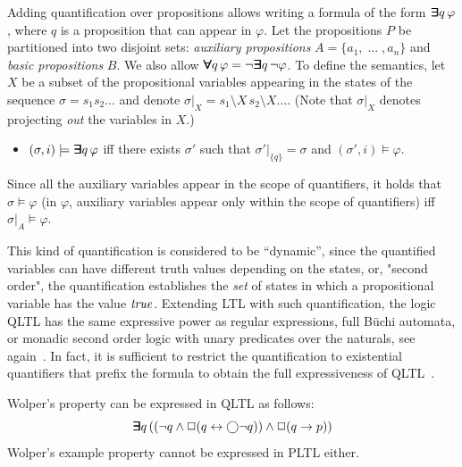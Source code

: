Adding quantification over propositions allows writing a formula of the form
$\bm{\exists}\kern-0.6em\bm{\exists} q \, \varphi$, where $q$ is a proposition that can appear in $\varphi$.
Let the propositions $P$ be partitioned into two disjoint sets: 
{\em auxiliary propositions} $A = \{ a_1 , \; \ldots\; , a_n \}$
and {\em basic propositions} $B$. 
We also allow $\bm{\forall}\kern-0.6em\bm{\forall} q\, \varphi =
\neg \bm{\exists}\kern-0.6em\bm{\exists} q\, \neg \varphi$.
To define the semantics, let $X$ be a subset of 
the propositional variables appearing in the states of the sequence $\sigma = s_1 s_2 \ldots$ and 
denote $\sigma |_X = s_1 \setminus X \, s_2 \setminus X \ldots$. (Note that $\sigma |_X$ denotes projecting {\em out} the variables in $X$.)



\begin{itemize}
\item $( \sigma, i ) \models \boldsymbol{\bm{\exists}\kern-0.6em\bm{\exists}} q \, \varphi$ iff there exists
$\sigma'$ such that $\sigma' |_{\{ q \} } = \sigma$ and 
$( \sigma', i) \models \varphi$.
\end{itemize}
Since all the auxiliary variables appear in the scope of
quantifiers, it holds that $\sigma \models \varphi$
(in $\varphi$, auxiliary variables appear only within
the scope of quantifiers)
iff $\sigma |_A \models \varphi$.

This kind of quantification is considered to be ``dynamic'', since the quantified variables can have different truth values depending on the states, or, "second order", the quantification establishes the {\em set} of states in which a propositional variable has the value $\mathit{true}$.
Extending LTL with such quantification, the logic QLTL has the same expressive power as regular expressions, full B\"{u}chi
automata, or monadic second order logic with unary predicates over the naturals, see again~\cite{Thomas}.
In fact, it is sufficient to restrict the quantification to existential quantifiers that prefix the formula to obtain the full expressiveness of QLTL~\cite{Thomas}. 

\noindent
Wolper's property can be expressed in QLTL as follows:
\begin{equation} \label{form0} \bm{\exists}\kern-0.6em\bm{\exists} q \,
( (  \neg q \wedge \Box (q \leftrightarrow \bigcirc \neg q )  )  \wedge \Box (q \rightarrow p ) )\end{equation}
Wolper's example property cannot be expressed in PLTL either.

